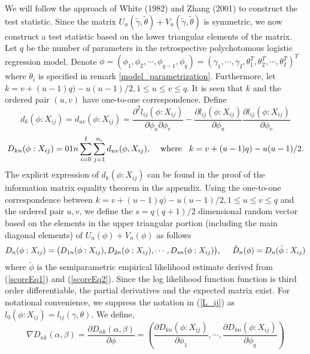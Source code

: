 \documentclass[11pt]{article}
\def\le{\leqslant}
\theoremstyle{plain}
\theoremstyle{definition}
\theoremstyle{remark}
\theoremstyle{definition}
\begin{document}
We will follow the approach of White (1982) and Zhang (2001) to
construct the test statistic. Since the matrix
$U_n(\tilde{\gamma},\tilde{\theta})+V_n(\tilde{\gamma},\tilde{\theta})$
is symmetric, we now construct a test statistic based on the lower
triangular elements of the matrix. Let $q$ be the number of
parameters in the retrospective polychotomous logistic regression model. Denote
$\phi=(\phi_1, \phi_2, \cdots, \phi_{q-1}, \phi_q)=(\gamma_1,
\cdots, \gamma_I,\theta_1^T, \theta_2^T, \cdots,
\theta_{I}^T)^T$ where $\theta_i$ is specified in remark \ref{model_parametrization}.
Furthermore, let $k=v+(u-1)q)-u(u-1)/2, 1\le u\le v\le q$. It is seen that $k$ and the ordered pair $(u, v)$ have one-to-one correspondence. Define
\begin{equation}
d_{k}(\phi: X_{ij})=d_{uv}(\phi: X_{ij})=\frac{\partial^2l_{ij}(\phi:X_{ij})}{\partial
\phi_u\partial \phi_v}-\frac{\partial
l_{ij}(\phi:X_{ij})}{\partial\phi_u} \frac{\partial l_{ij}(\phi :
X_{ij})}{\partial \phi_v}\label{cell-difference}
\end{equation}
$$D_{kn}(\phi:X_{ij})=
\frac{1}{n}\sum_{i=0}^I\sum_{j=1}^{n_i}d_{uv}(\phi, X_{ij}), \hspace{4mm}\mbox{where}\hspace{3mm} k=v+(u-1)q)-u(u-1)/2.$$
The explicit expression of $d_{k}(\phi:X_{ij})$ can be found in the proof of the information matrix equality theorem in the appendix. Using the one-to-one correspondence between $k=v+(u-1)q)-u(u-1)/2, 1\le u\le v\le q$ and the ordered pair $u,v$, we define the $s=q(q+1)/2$ dimensional random vector based on the elements in the upper triangular portion (including the main diagonal elements) of $U_n(\phi) + V_n(\phi)$ as follows
\begin{equation}
D_n(\phi: X_{ij})=\big(D_{1n}(\phi: X_{ij}),
D_{2n}(\phi: X_{ij}),\cdots, D_{sn}(\phi: X_{ij})\big),
\hspace{5mm} \tilde{D}_n(\phi)=D_n(\tilde{\phi}: X_{ij})
\end{equation}
where $\tilde{\phi}$ is the semiparametric empirical likelihood estimate derived from (\ref{scoreEq1}) and (\ref{scoreEq2}). Since the log likelihood function function is third order differentiable, the partial derivatives and the expected matrix exist. For notational convenience, we suppress the notation in (\ref{L_ij}) as $l_0(\phi:X_{ij})=l_{ij}(\gamma, \theta)$. We define,
\begin{equation}
\nabla D_{nk}(\alpha,\beta)=\frac{\partial
D_{nk}(\alpha,\beta)}{\partial \phi}=\left(\frac{\partial D_{kn}(\phi: X_{ij})}{\partial \phi_1}, \cdots,  \frac{\partial D_{kn}(\phi: X_{ij})}{\partial \phi_q} \right)
\end{equation}
\end{document}
